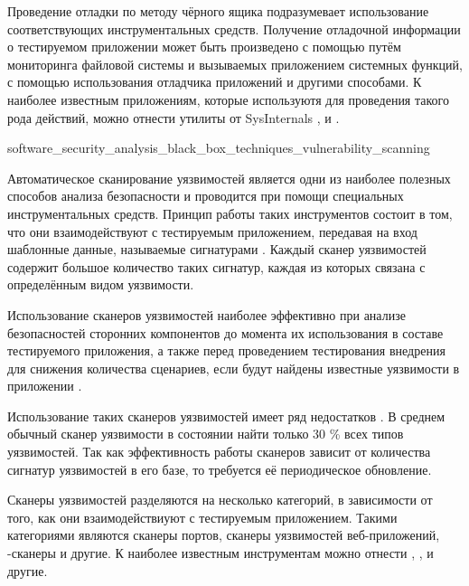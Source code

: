 %
Проведение отладки по методу чёрного ящика подразумевает использование соответствующих 
инструментальных средств. 
%
Получение отладочной информации о тестируемом приложении может быть произведено с помощью путём 
мониторинга файловой системы и вызываемых приложением системных функций, с помощью использования 
отладчика приложений и другими способами. 
%
К наиболее известным приложениям, которые используютя для проведения такого рода действий, можно 
отнести утилиты от SysInternals ,   
и  .


	{software_security_analysis_black_box_techniques_vulnerability_scanning}

%
Автоматическое сканирование уязвимостей является одни из наиболее полезных способов анализа 
безопасности  и проводится при помощи специальных инструментальных средств. 
%
Принцип работы таких инструментов состоит в том, что они взаимодействуют с тестируемым приложением, 
передавая на вход шаблонные данные, называемые сигнатурами . 
%
Каждый сканер уязвимостей содержит большое количество таких сигнатур, каждая из которых связана 
с определённым видом уязвимости.

%
Использование сканеров уязвимостей наиболее эффективно при анализе безопасностей сторонних 
компонентов до момента их использования в составе тестируемого приложения, а также перед 
проведением тестирования внедрения для снижения количества сценариев, если будут найдены известные 
уязвимости в приложении . 

%
Использование таких сканеров уязвимостей имеет ряд недостатков . 
%
В среднем обычный сканер уязвимости в состоянии найти только 30 \% всех типов уязвимостей. 
%
Так как эффективность работы сканеров зависит от количества сигнатур уязвимостей в его базе, 
то требуется её периодическое обновление.

%
Сканеры уязвимостей разделяются на несколько категорий, в зависимости от того, как они 
взаимодействиуют с тестируемым приложением. 
%
Такими категориями являются сканеры портов, сканеры уязвимостей веб-приложений, 
-сканеры и другие. 
%
К наиболее известным инструментам можно отнести  ,  
,   и другие.

